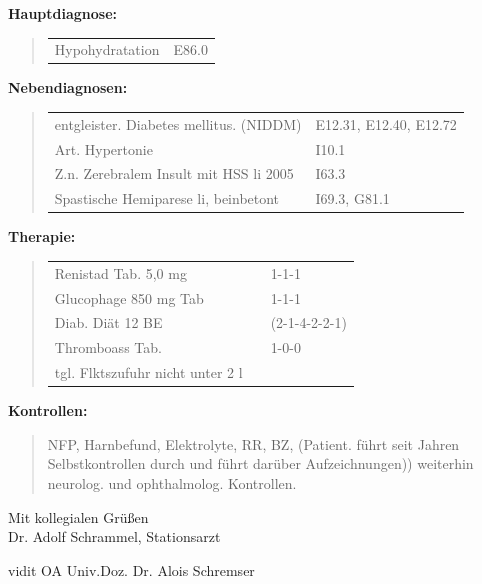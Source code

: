 {\MarginNo{\Z{}}
{\bfseries Hauptdiagnose:}

\begin{quote}
\begin{tabular}{ll}
Hypohydratation & E86.0
\\
\end{tabular}
\end{quote}

{\bfseries Nebendiagnosen:}

\begin{quote}
\begin{tabular}{ll}
entgleister. Diabetes mellitus. (NIDDM) & E12.31, E12.40,
E12.72
\\
Art. Hypertonie & I10.1
\\
Z.n. Zerebralem Insult mit HSS li 2005& I63.3
\\
Spastische Hemiparese li, beinbetont&I69.3, G81.1
\\
\end{tabular}
\end{quote}



{\bfseries Therapie:}

\begin{quote}
\begin{tabular}{lll}
Renistad Tab. 5,0 mg && 1-1-1 
\\
Glucophage 850 mg Tab && 1-1-1 
\\
Diab. Diät 12 BE&&(2-1-4-2-2-1) 
\\
Thromboass Tab.&&1-0-0 
\\
tgl. Flktszufuhr nicht unter 2 l&&
\end{tabular}
\end{quote}




{\bfseries Kontrollen:}

\begin{quote}
  NFP, Harnbefund, Elektrolyte, RR, BZ, (Patient. führt seit
  Jahren Selbstkontrollen durch und führt darüber
  Aufzeichnungen)) weiterhin neurolog. und ophthalmolog.
  Kontrollen.
\end{quote}









Mit kollegialen Grüßen\vspace{2em}\\ Dr. Adolf Schrammel, Stationsarzt


vidit OA Univ.Doz. Dr. Alois Schremser
}

